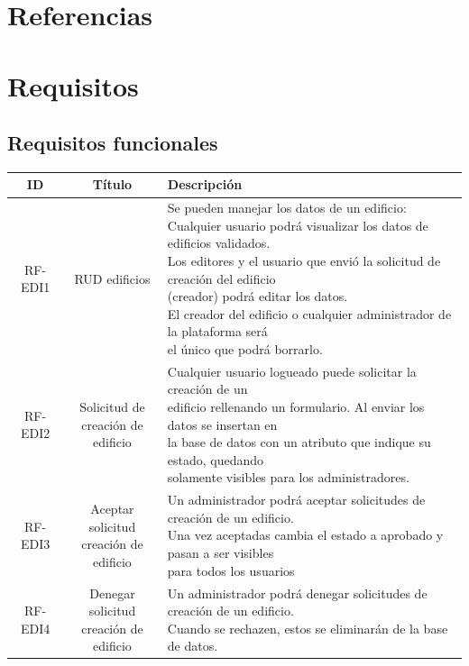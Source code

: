 \documentclass[12pt, a4paper, twoside]{article}
\begin{document}
\section{Referencias}

\section{Requisitos}
\subsection{Requisitos funcionales}
\begin{table}
  \footnotesize
  \begin{tabular}{ |c|c|l| }
  \hline
  ID      & Título & Descripción \\ \hline
  RF-EDI1 & RUD edificios & \makecell[l]{Se pueden manejar los datos de un edificio: \\
    Cualquier usuario podrá visualizar los datos de edificios validados. \\
    Los editores y el usuario que envió la solicitud de creación del edificio \\ 
    (creador) podrá editar los datos. \\
    El creador del edificio o cualquier administrador de la plataforma será \\
    el único que podrá borrarlo.
    }  \\ \hline
  RF-EDI2 & \makecell{Solicitud de \\ creación de edificio}
    & \makecell[l]{Cualquier usuario logueado puede solicitar la creación de un \\ 
    edificio rellenando un formulario. Al enviar los datos se insertan en \\
    la base de datos con un atributo que indique su estado, quedando \\
    solamente visibles para los administradores. 
    } \\ \hline
  RF-EDI3 & \makecell{Aceptar solicitud \\ creación de edificio}
    & \makecell[l]{Un administrador podrá aceptar solicitudes de creación de un edificio. \\
    Una vez aceptadas cambia el estado a aprobado y pasan a ser visibles \\
    para todos los usuarios 
    }\\ \hline
  RF-EDI4 & \makecell{Denegar solicitud \\ creación de edificio}
    & \makecell[l]{Un administrador podrá denegar solicitudes de creación de un edificio. \\
    Cuando se rechazen, estos se eliminarán de la base de datos. 
    } \\ \hline
  

\end{tabular}
\end{table}
\end{document}
